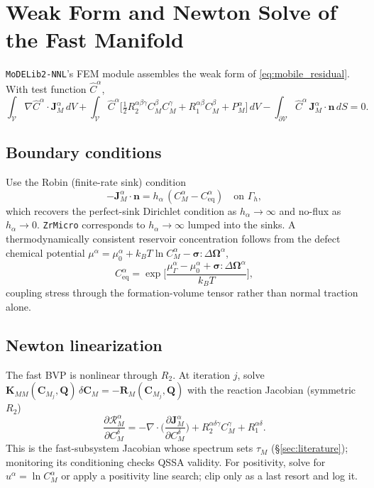 \documentclass[11pt]{article}
\newcommand{\CM}{\mathbf{C}_{M}}
\newcommand{\sig}{\bm{\sigma}}
\newcommand{\grad}{\nabla}
\newcommand{\Div}{\nabla\cdot}
\newcommand{\kb}{k_{B}}
\newcommand{\V}{\mathcal{V}}
\newcommand{\dV}{\,dV}
\newcommand{\dS}{\,dS}
\newcommand{\ZrMicro}{\texttt{ZrMicro}}
\newcommand{\MoDELib}{\texttt{MoDELib2-NNL}}
\begin{document}
\section{Weak Form and Newton Solve of the Fast Manifold}
\label{sec:weak}

\MoDELib{}'s FEM module assembles the weak form of \eqref{eq:mobile_residual}.
With test function $\widehat C^\alpha$,
\begin{equation}
\label{eq:weak_fast}
    \int_{\V}\grad\widehat C^{\alpha}\cdot\mathbf J_M^{\alpha}\dV
    + \int_{\V}\widehat C^{\alpha}\Big[\tfrac12 R_2^{\alpha\beta\gamma}C_M^\beta C_M^\gamma + R_1^{\alpha\beta}C_M^\beta + P_M^\alpha\Big]\dV
    - \int_{\partial\V}\widehat C^{\alpha}\,\mathbf J_M^{\alpha}\cdot\mathbf n\dS = 0.
\end{equation}

\subsection{Boundary conditions}

Use the Robin (finite-rate sink) condition
\begin{equation}
\label{eq:robin_bc}
    -\mathbf J_M^\alpha\cdot\mathbf n = h_\alpha\,(C_M^\alpha - C_{\mathrm{eq}}^\alpha)
    \quad\text{on }\Gamma_h,
\end{equation}
which recovers the perfect-sink Dirichlet condition as $h_\alpha\to\infty$ and
no-flux as $h_\alpha\to0$. \ZrMicro{} corresponds to $h_\alpha\to\infty$ lumped
into the sinks. A thermodynamically consistent reservoir concentration follows
from the defect chemical potential
$\mu^\alpha=\mu_0^\alpha+\kb T\ln C_M^\alpha-\sig:\Delta\bm\Omega^\alpha$,
\begin{equation}
\label{eq:ceq_mu}
    C_{\mathrm{eq}}^\alpha
    = \exp\!\Big[\frac{\mu_\Gamma^\alpha-\mu_0^\alpha+\sig:\Delta\bm\Omega^\alpha}{\kb T}\Big],
\end{equation}
coupling stress through the formation-volume tensor rather than normal traction
alone.

\subsection{Newton linearization}

The fast BVP is nonlinear through $R_2$. At iteration $j$, solve
$\mathbf K_{MM}(\CM_j,\mathbf Q)\,\delta\CM = -\mathbf R_M(\CM_j,\mathbf Q)$ with
the reaction Jacobian (symmetric $R_2$)
\begin{equation}
\label{eq:reaction_jacobian}
    \frac{\partial\mathcal R_M^\alpha}{\partial C_M^\delta}
    = -\Div\Big(\frac{\partial\mathbf J_M^\alpha}{\partial C_M^\delta}\Big)
    + R_2^{\alpha\delta\gamma}C_M^\gamma + R_1^{\alpha\delta}.
\end{equation}
This is the fast-subsystem Jacobian whose spectrum sets $\tau_M$
(\S\ref{sec:literature}); monitoring its conditioning checks QSSA validity. For
positivity, solve for $u^\alpha=\ln C_M^\alpha$ or apply a positivity line
search; clip only as a last resort and log it.
\end{document}
